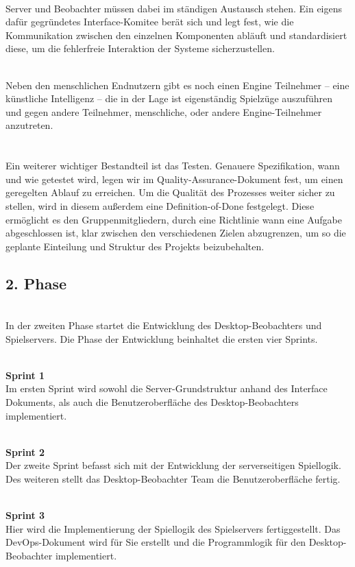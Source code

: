 \documentclass[11pt, a4paper]{article} %
\begin{document}
\ \\Server und Beobachter müssen dabei im ständigen Austausch stehen. Ein eigens dafür gegründetes Interface-Komitee berät sich und legt fest, wie die Kommunikation zwischen den einzelnen Komponenten abläuft und standardisiert diese, um die fehlerfreie Interaktion der Systeme sicherzustellen.

\ \\Neben den menschlichen Endnutzern gibt es noch einen Engine Teilnehmer – eine künstliche Intelligenz – die in der Lage ist eigenständig Spielzüge auszuführen und gegen andere Teilnehmer, menschliche, oder andere Engine-Teilnehmer anzutreten.\\\\

\ \\Ein weiterer wichtiger Bestandteil ist das Testen. Genauere Spezifikation, wann und wie getestet wird, legen wir im Quality-Assurance-Dokument fest, um einen geregelten Ablauf zu erreichen. Um die Qualität des Prozesses weiter sicher zu stellen, wird in diesem außerdem eine Definition-of-Done festgelegt. Diese ermöglicht es den Gruppenmitgliedern, durch eine Richtlinie wann eine Aufgabe abgeschlossen ist, klar zwischen den verschiedenen Zielen abzugrenzen, um so die geplante Einteilung und Struktur des Projekts beizubehalten.\\


\subsection*{2. Phase}

\ \\In der zweiten Phase startet die Entwicklung des Desktop-Beobachters und Spielservers. Die Phase der Entwicklung beinhaltet die ersten vier Sprints.

\ \\\textbf{Sprint 1}
\ \\Im ersten Sprint wird sowohl die Server-Grundstruktur anhand des Interface Dokuments, als auch die Benutzeroberfläche des Desktop-Beobachters implementiert.

\ \\\textbf{Sprint 2}
\ \\Der zweite Sprint befasst sich mit der Entwicklung der serverseitigen Spiellogik. Des weiteren stellt das Desktop-Beobachter Team die Benutzeroberfläche fertig.

\ \\\textbf{Sprint 3}
\ \\Hier wird die Implementierung der Spiellogik des Spielservers fertiggestellt. Das DevOps-Dokument wird für Sie erstellt und die Programmlogik für den Desktop-Beobachter implementiert.
\end{document}
